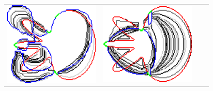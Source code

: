 \begin{figure}
\begin{tabular}{cccc}
\includegraphics[scale=0.2]{figures/chapter9/constrained-elastica/localsearch/flower-1/len_pen-0.0002/radius-15/nc-4/h1.0/summary.pdf} &
\includegraphics[scale=0.2]{figures/chapter9/constrained-elastica/graphflow/flower-1/len_pen-0.002/radius-15/N-1/h1.0/summary.pdf} &

\end{tabular}
\end{figure}
